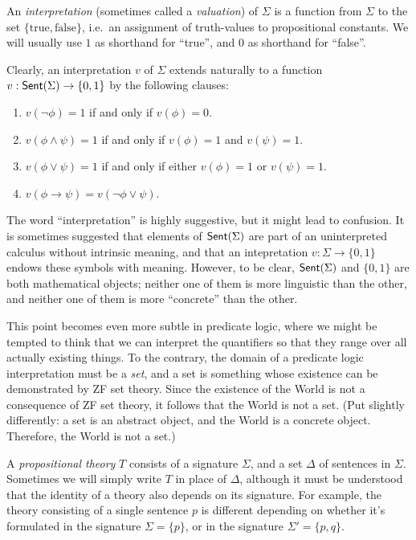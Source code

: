 \begin{defn} An \emph{interpretation} (sometimes called a
  \emph{valuation}) of $\Sigma$ is a function from $\Sigma$ to the set
  $\{ \mathrm{true},\mathrm{false} \}$, i.e.\ an assignment of
  truth-values to propositional constants.  We will usually use $1$ as
  shorthand for ``true'', and $0$ as shorthand for ``false''.

  Clearly, an interpretation $v$ of $\Sigma$ extends naturally to a
  function $v:\mathsf{Sent}(\Sigma )\to \{ 0,1\}$ by the following clauses:
  \begin{enumerate}
\item $v(\neg \phi )=1$ if and only if $v(\phi )=0$. 
\item $v(\phi\wedge\psi )=1$ if and only if $v(\phi )=1$ and $v(\psi )=1$.
\item $v(\phi\vee\psi )=1$ if and only if either $v(\phi )=1$ or
  $v(\psi )=1$.
\item $v(\phi\to\psi )=v(\neg\phi\vee
  \psi)$. \end{enumerate} \end{defn}

\begin{disc} The word ``interpretation'' is highly suggestive, but it
  might lead to confusion.  It is sometimes suggested that elements of
  $\mathsf{Sent}(\Sigma )$ are part of an uninterpreted calculus without intrinsic
  meaning, and that an intepretation $v:\Sigma\to \{ 0,1\}$ endows
  these symbols with meaning.  However, to be clear, $\mathsf{Sent}(\Sigma )$ and
  $\{ 0,1\}$ are both mathematical objects; neither one of them is
  more linguistic than the other, and neither one of them is more
  ``concrete'' than the other.

  This point becomes even more subtle in predicate logic, where we
  might be tempted to think that we can interpret the quantifiers so
  that they range over all actually existing things.  To the contrary,
  the domain of a predicate logic interpretation must be a {\it set},
  and a set is something whose existence can be demonstrated by ZF set
  theory.  Since the existence of the World is not a consequence of ZF
  set theory, it follows that the World is not a set.  (Put slightly
  differently: a set is an abstract object, and the World is a
  concrete object.  Therefore, the World is not a set.)  \end{disc}


\begin{defn} A \emph{propositional theory} $T$ consists of a signature
  $\Sigma$, and a set $\Delta$ of sentences in $\Sigma$.  Sometimes we
  will simply write $T$ in place of $\Delta$, although it must be
  understood that the identity of a theory also depends on its
  signature.  For example, the theory consisting of a single sentence
  $p$ is different depending on whether it's formulated in the
  signature $\Sigma = \{ p\}$, or in the signature
  $\Sigma '=\{ p,q\}$. \end{defn}


